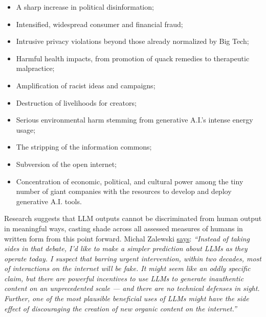 \begin{itemize}
\item A sharp increase in political disinformation;
\item Intensified, widespread consumer and financial fraud;
\item Intrusive privacy violations beyond those already normalized by Big Tech;
\item Harmful health impacts, from promotion of quack remedies to therapeutic malpractice;
\item Amplification of racist ideas and campaigns;
\item Destruction of livelihoods for creators;
\item Serious environmental harm stemming from generative A.I.’s intense energy usage;
\item The stripping of the information commons;
\item Subversion of the open internet;
\item Concentration of economic, political, and cultural power among the tiny number of giant companies with the resources to develop and deploy generative A.I. tools.
\end{itemize}

Research suggests that LLM outputs cannot be discriminated from human output in meaningful ways, casting shade across all assessed measures of humans in written form \cite{sadasivan2023can} from this point forward. Michal Zalewski \href{https://lcamtuf.substack.com/p/llms-a-bleak-future-ahead}{says}: \textit{``Instead of taking sides in that debate, I’d like to make a simpler prediction about LLMs as they operate today. I suspect that barring urgent intervention, within two decades, most of interactions on the internet will be fake. It might seem like an oddly specific claim, but there are powerful incentives to use LLMs to generate inauthentic content on an unprecedented scale — and there are no technical defenses in sight. Further, one of the most plausible beneficial uses of LLMs might have the side effect of discouraging the creation of new organic content on the internet.''}

